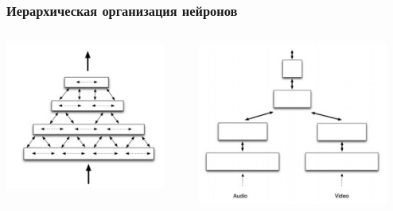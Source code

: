 \documentclass[default]{beamer}
\begin{document}
	\begin{frame}
		\frametitle{Иерархическая организация нейронов}
		
		\begin{columns}
			\begin{column}{0.5\textwidth}
				\includegraphics[width=0.9\textwidth]{mpf/hierarchy}
			\end{column}
			\begin{column}{0.5\textwidth}
				\includegraphics[width=0.9\textwidth]{mpf/hierarchy_conv}
			\end{column}
		\end{columns}
		
	\end{frame}
	
\end{document}
